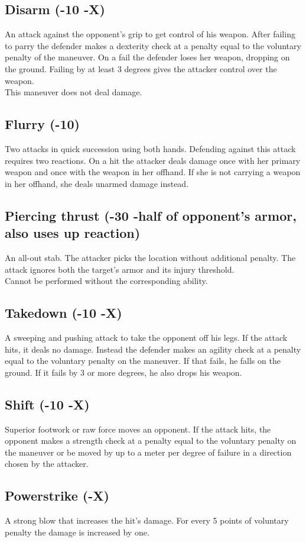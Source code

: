 \subsection*{Disarm (-10 -X)}
An attack against the opponent’s grip to get control of his weapon. After failing to parry the defender makes a dexterity check at a penalty equal to the voluntary penalty of the maneuver. On a fail the defender loses her weapon, dropping on the ground. Failing by at least 3 degrees gives the attacker control over the weapon.\\
This maneuver does not deal damage.
\subsection*{Flurry (-10)}
Two attacks in quick succession using both hands. Defending against this attack requires two reactions. On a hit the attacker deals damage once with her primary weapon and once with the weapon in her offhand. If she is not carrying a weapon in her offhand, she deals unarmed damage instead. 
\subsection*{Piercing thrust (-30 -half of opponent’s armor, also uses up reaction)}
An all-out stab. The attacker picks the location without additional penalty. The attack ignores both the target's armor and its injury threshold.\\
Cannot be performed without the corresponding ability.
\subsection*{Takedown (-10 -X)}
A sweeping and pushing attack to take the opponent off his legs. If the attack hits, it deals no damage. Instead the defender makes an agility check at a penalty equal to the voluntary penalty on the maneuver. If that fails, he falls on the ground. If it fails by 3 or more degrees, he also drops his weapon.
\subsection*{Shift (-10 -X)}
Superior footwork or raw force moves an opponent. If the attack hits, the opponent makes a strength check at a penalty equal to the voluntary penalty on the maneuver or be moved by up to a meter per degree of failure in a direction chosen by the attacker.
\subsection*{Powerstrike (-X)}
A strong blow that increases the hit’s damage. For every 5 points of voluntary penalty the damage is increased by one.
